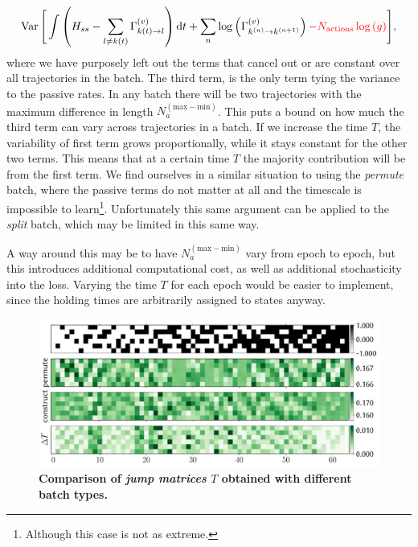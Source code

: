 \begin{equation}
\begin{aligned}
\operatorname{Var}\Bigg[\int\left(H_{s s}-\sum_{l \neq k(t)}\Gamma_{k(t) \rightarrow l}^{(v)}\right)\mathrm{d} t 
+ \sum_{n} \log \left(\Gamma_{k^{(n)} \rightarrow k^{(n+1)}}^{(v)}\right) \textcolor{red}{- N_{\text{actions}}\log{(g)}}\Bigg],
\end{aligned}
\end{equation}
where we have purposely left out the terms that cancel out or are constant over all trajectories in the batch. The third term, is the only term tying the variance to the passive rates. In any batch there will be two trajectories with the maximum difference in length $N_a^{(\text{max}-\text{min})}$. This puts a bound on how much the third term can vary across trajectories in a batch. If we increase the time $T$, the variability of first term grows proportionally, while it stays constant for the other two terms. This means that at a certain time $T$ the majority contribution will be from the first term. We find ourselves in a similar situation to using the \emph{permute} batch, where the passive terms do not matter at all and the timescale is impossible to learn\footnote{Although this case is not as extreme.}. Unfortunately this same argument can be applied to the \emph{split} batch, which may be limited in this same way.

A way around this may be to have $N_a^{(\text{max}-\text{min})}$ vary from epoch to epoch, but this introduces additional computational cost, as well as additional stochasticity into the loss. Varying the time $T$ for each epoch would be easier to implement, since the holding times are arbitrarily assigned to states anyway. 

\begin{figure}[h]
	\centering
	\includegraphics[width=1\linewidth]{Chapter5/Figs/Vector/rate_compare1}
	\caption[Comparison of \emph{jump matrices} $T$ obtained with different batch types]{\textbf{Comparison of \emph{jump matrices} $T$ obtained with different batch types.}}
	\label{fig:ratecompare1}
\end{figure}

